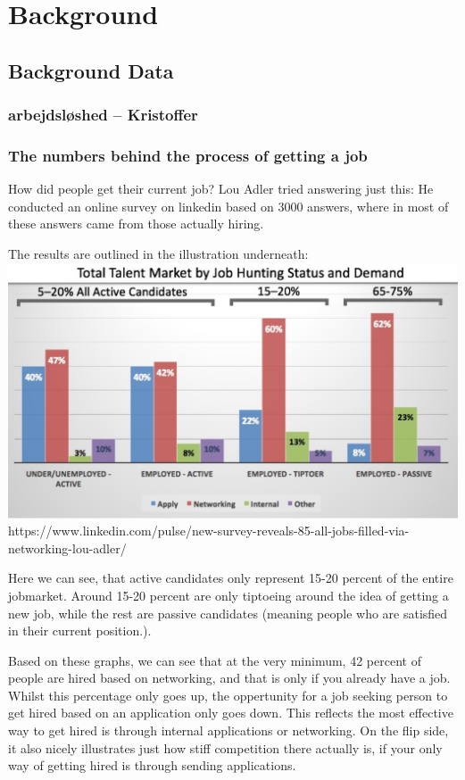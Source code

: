 \section{Background}\label{sec:background}

\subsection{Background Data}

\subsubsection{arbejdsløshed -- Kristoffer}


\subsubsection{The numbers behind the process of getting a job}
How did people get their current job?
Lou Adler tried answering just this: He conducted an online survey
on linkedin based on 3000 answers, where in most of these answers
came from those actually hiring.

The results are outlined in the illustration underneath:
\includegraphics{figures/hiringpeople.png}
https://www.linkedin.com/pulse/new-survey-reveals-85-all-jobs-filled-via-networking-lou-adler/

Here we can see, that active candidates only represent 15-20 percent of the
entire jobmarket. Around 15-20 percent are only tiptoeing around the idea
of getting a new job, while the rest are passive candidates (meaning people who are
satisfied in their current position.).

Based on these graphs, we can see that at the very minimum, 42 percent of people are
hired based on networking, and that is only if you already have a job.
Whilst this percentage only goes up, the oppertunity for a job seeking person
to get hired based on an application only goes down. This reflects the
most effective way to get hired is through internal applications or networking.
On the flip side, it also nicely illustrates just how stiff competition there actually is,
if your only way of getting hired is through sending applications.

